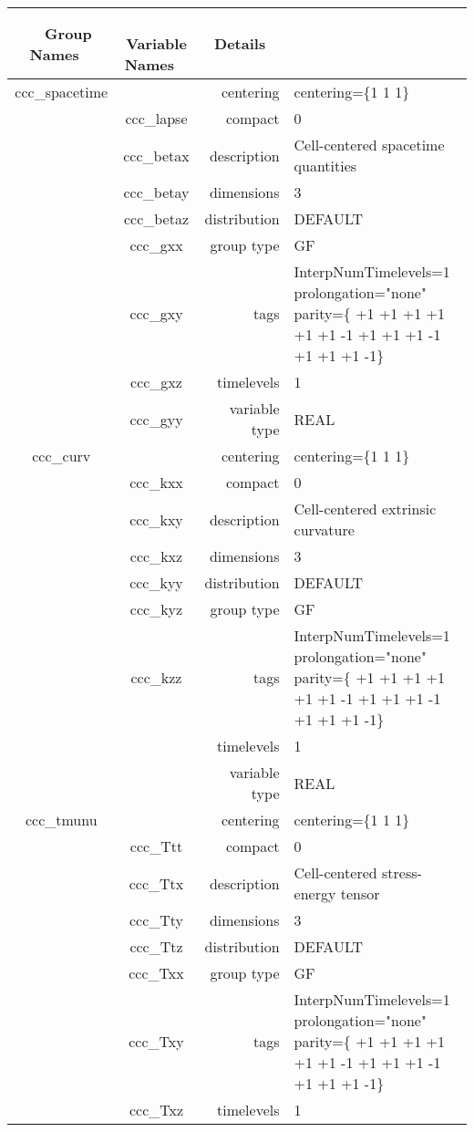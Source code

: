 \documentclass{article}
\begin{document}
\begin{tabular*}{150mm}{|c|c@{\extracolsep{\fill}}|rl|} \hline 
~ {\bf Group Names} ~ & ~ {\bf Variable Names} ~  &{\bf Details} ~ & ~\\ 
\hline 
ccc\_spacetime &  & centering & centering=\{1 1 1\} \\ 
 & ccc\_lapse & compact & 0 \\ 
 & ccc\_betax & description & Cell-centered spacetime quantities \\ 
 & ccc\_betay & dimensions & 3 \\ 
 & ccc\_betaz & distribution & DEFAULT \\ 
 & ccc\_gxx & group type & GF \\ 
 & ccc\_gxy & tags & InterpNumTimelevels=1 prolongation="none" parity=\{ +1 +1 +1  +1 +1 +1  -1 +1 +1  +1 -1 +1  +1 +1 -1\} \\ 
 & ccc\_gxz & timelevels & 1 \\ 
 & ccc\_gyy & variable type & REAL \\ 
\hline 
ccc\_curv &  & centering & centering=\{1 1 1\} \\ 
 & ccc\_kxx & compact & 0 \\ 
 & ccc\_kxy & description & Cell-centered extrinsic curvature \\ 
 & ccc\_kxz & dimensions & 3 \\ 
 & ccc\_kyy & distribution & DEFAULT \\ 
 & ccc\_kyz & group type & GF \\ 
 & ccc\_kzz & tags & InterpNumTimelevels=1 prolongation="none" parity=\{ +1 +1 +1  +1 +1 +1  -1 +1 +1  +1 -1 +1  +1 +1 -1\} \\ 
 &  & timelevels & 1 \\ 
 &  & variable type & REAL \\ 
\hline 
ccc\_tmunu &  & centering & centering=\{1 1 1\} \\ 
 & ccc\_Ttt & compact & 0 \\ 
 & ccc\_Ttx & description & Cell-centered stress-energy tensor \\ 
 & ccc\_Tty & dimensions & 3 \\ 
 & ccc\_Ttz & distribution & DEFAULT \\ 
 & ccc\_Txx & group type & GF \\ 
 & ccc\_Txy & tags & InterpNumTimelevels=1 prolongation="none" parity=\{ +1 +1 +1  +1 +1 +1  -1 +1 +1  +1 -1 +1  +1 +1 -1\} \\ 
 & ccc\_Txz & timelevels & 1 \\ 

\end{tabular*}
\end{document}
